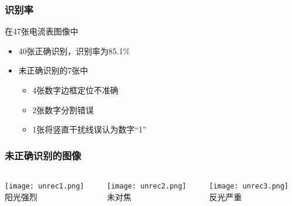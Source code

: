 \documentclass[12pt,hyperref={CJKbookmarks=true}]{beamer}
\begin{document}
\begin{frame}
\frametitle{识别率}
  在47张电流表图像中
  \begin{itemize}
  \item 40张正确识别，识别率为85.1\%
  \item 未正确识别的7张中
    \begin{itemize}
    \item 4张数字边框定位不准确
    \item 2张数字分割错误
    \item 1张将竖直干扰线误认为数字“1”
    \end{itemize}
  \end{itemize}
\end{frame}
\begin{frame}
  \frametitle{未正确识别的图像}
  \begin{columns}[onlytextwidth]
    \begin{column}{0.3\textwidth}
      \centering
      \texttt{[image: unrec1.png]}\\
      \footnotesize 阳光强烈
    \end{column}
    \begin{column}{0.3\textwidth}
      \centering
      \texttt{[image: unrec2.png]}\\
      \footnotesize 未对焦
    \end{column}
    \begin{column}{0.3\textwidth}
      \centering
      \texttt{[image: unrec3.png]}\\
      \footnotesize 反光严重
    \end{column}
  \end{columns}
\end{frame}
\end{document}
